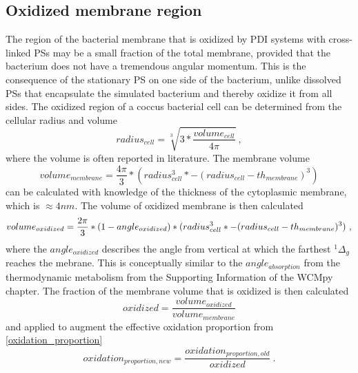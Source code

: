 \subsection{Oxidized membrane region}
The region of the bacterial membrane that is oxidized by PDI systems with cross-linked PSs may be a small fraction of the total membrane, provided that the bacterium does not have a tremendous angular momentum. This is the consequence of the stationary PS on one side of the bacterium, unlike dissolved PSs that encapsulate the simulated bacterium and thereby oxidize it from all sides. The oxidized region of a coccus bacterial cell can be determined from the cellular radius and volume
\begin{equation}
    radius_{cell} = \sqrt[3]{3*\frac{volume_{cell}}{4\pi}}~,
\end{equation}
where the volume is often reported in literature. The membrane volume 
\begin{equation}
    volume_{membrane} = \frac{4\pi}{3}*(radius_{cell}^3* - (radius_{cell}-th_{membrane})^3)
\end{equation}
can be calculated with knowledge of the thickness of the cytoplasmic membrane, which is $\approx 4 nm$. The volume of oxidized membrane is then calculated
\begin{equation}
    volume_{oxidized} = \frac{2\pi}{3}*(1-angle_{oxidized})\\ 
        *(radius_{cell}^3* - (radius_{cell}-th_{membrane})^3)~,    
\end{equation}
where the $angle_{oxidized}$ describes the angle from vertical at which the farthest $^1\Delta_g$ reaches the mebrane. This is conceptually similar to the $angle_{absorption}$ from the thermodynamic metabolism from the Supporting Information of the WCMpy chapter. The fraction of the membrane volume that is oxidized is then calculated 
\begin{equation}
    oxidized = \frac{volume_{oxidized}}{volume_{membrane}} 
\end{equation}
and applied to augment the effective oxidation proportion from \cref{oxidation_proportion}
\begin{equation}
    oxidation_{proportion,new} = \frac{oxidation_{proportion,old}}{oxidized}~.
\end{equation}
